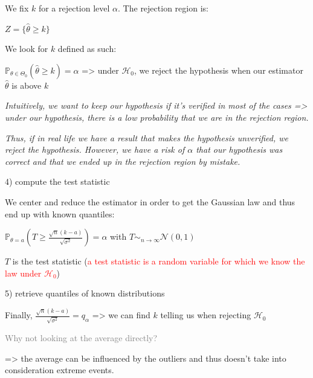 We fix $k$ for a rejection level $\alpha$. The rejection region is:

$Z=\{\widehat{\theta} \ge k\}$

\vspace{5mm}

We look for $k$ defined as such:

$\mathbb{P}_{\theta \in \Theta_0}(\widehat{\theta} \ge k)=\alpha$ => under $\mathcal{H}_0$, we reject the hypothesis when our estimator $\widehat{\theta}$ is above $k$

\textit{Intuitively, we want to keep our hypothesis if it's verified in most of the cases => under our hypothesis, there is a low probability that we are in the rejection region.}

\textit{Thus, if in real life we have a result that makes the hypothesis unverified, we reject the hypothesis. However, we have a risk of $\alpha$ that our hypothesis was correct and that we ended up in the rejection region by mistake.}

\vspace{5mm}

4) compute the test statistic

\vspace{5mm}

We center and reduce the estimator in order to get the Gaussian law and thus end up with known quantiles:

$\mathbb{P}_{\theta = a}(T \ge \frac{\sqrt{n} (k-a)}{\sqrt{\sigma^2}})=\alpha$ with $T \sim_{n \to \infty} \mathcal{N}(0,1)$

$T$ is the test statistic (\textcolor{red}{a test statistic is a random variable for which we know the law under $\mathcal{H}_0$})

\vspace{5mm}

5) retrieve quantiles of known distributions

\vspace{5mm}

Finally, $\frac{\sqrt{n} (k-a)}{\sqrt{\sigma^2}}=q_\alpha$ => we can find $k$ telling us when rejecting $\mathcal{H}_0$

\vspace{5mm}

\textcolor{gray}{Why not looking at the average directly?}

=> the average can be influenced by the outliers and thus doesn't take into consideration extreme events.

\vspace{5mm}

